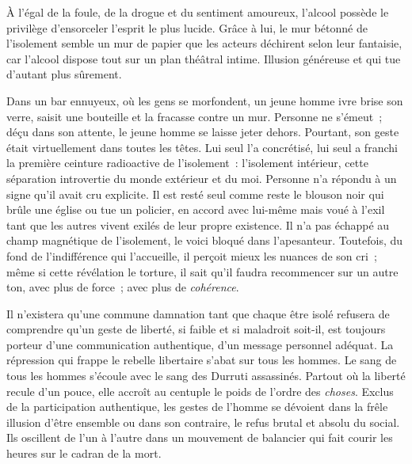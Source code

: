 \documentclass[french,twoside]{book} %
\newcommand{\astermono}{\medskip\centerline{\color{rubric}\large\selectfont{\syms ✻}}\medskip\par}%
\begin{document}
\noindent À l’égal de la foule, de la drogue et du sentiment amoureux, l’alcool possède le privilège d’ensorceler l’esprit le plus lucide. Grâce à lui, le mur bétonné de l’isolement semble un mur de papier que les acteurs déchirent selon leur fantaisie, car l’alcool dispose tout sur un plan théâtral intime. Illusion généreuse et qui tue d’autant plus sûrement.\par
Dans un bar ennuyeux, où les gens se morfondent, un jeune homme ivre brise son verre, saisit une bouteille et la fracasse contre un mur. Personne ne s’émeut ; déçu dans son attente, le jeune homme se laisse jeter dehors. Pourtant, son geste était virtuellement dans toutes les têtes. Lui seul l’a concrétisé, lui seul a franchi la première ceinture radioactive de l’isolement : l’isolement intérieur, cette séparation introvertie du monde extérieur et du moi. Personne n’a répondu à un signe qu’il avait cru explicite. Il est resté seul comme reste le blouson noir qui brûle une église ou tue un policier, en accord avec lui-même mais voué à l’exil tant que les autres vivent exilés de leur propre existence. Il n’a pas échappé au champ magnétique de l’isolement, le voici bloqué dans l’apesanteur. Toutefois, du fond de l’indifférence qui l’accueille, il perçoit mieux les nuances de son cri ; même si cette révélation le torture, il sait qu’il faudra recommencer sur un autre ton, avec plus de force ; avec plus de \emph{cohérence}.\par
Il n’existera qu’une commune damnation tant que chaque être isolé refusera de comprendre qu’un geste de liberté, si faible et si maladroit soit-il, est toujours porteur d’une communication authentique, d’un message personnel adéquat. La répression qui frappe le rebelle libertaire s’abat sur tous les hommes. Le sang de tous les hommes s’écoule avec le sang des Durruti assassinés. Partout où la liberté recule d’un pouce, elle accroît au centuple le poids de l’ordre des \emph{choses}. Exclus de la participation authentique, les gestes de l’homme se dévoient dans la frêle illusion d’être ensemble ou dans son contraire, le refus brutal et absolu du social. Ils oscillent de l’un à l’autre dans un mouvement de balancier qui fait courir les heures sur le cadran de la mort.\par

\astermono
\end{document}
